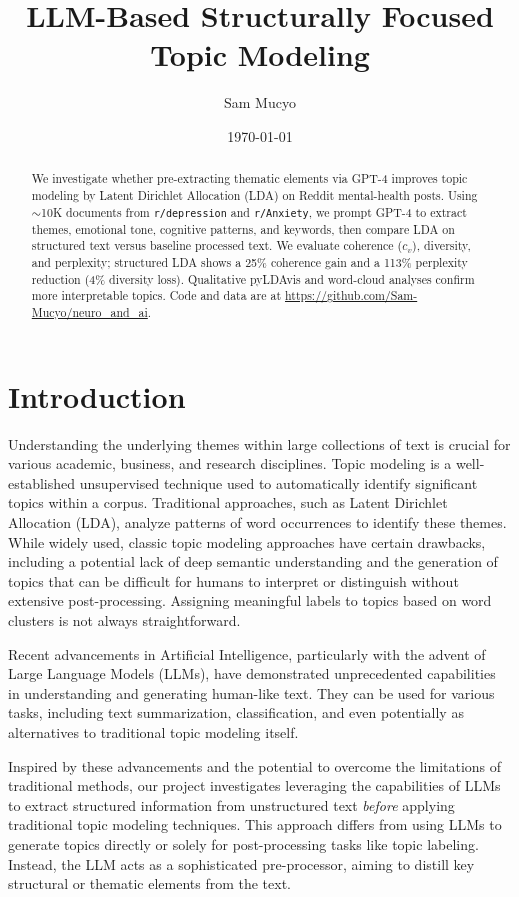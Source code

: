 \documentclass{article}
\title{LLM-Based Structurally Focused Topic Modeling}
\author{Sam Mucyo}
\date{\today}
\begin{document}
\maketitle
\doublespacing

\begin{abstract}
    We investigate whether pre-extracting thematic elements via GPT-4 improves topic modeling by Latent Dirichlet Allocation (LDA) on Reddit mental-health posts. Using $\sim$10K documents from \texttt{r/depression} and \texttt{r/Anxiety}, we prompt GPT-4 to extract themes, emotional tone, cognitive patterns, and keywords, then compare LDA on structured text versus baseline processed text. We evaluate coherence ($c_v$), diversity, and perplexity; structured LDA shows a 25\% coherence gain and a 113\% perplexity reduction (4\% diversity loss). Qualitative pyLDAvis and word-cloud analyses confirm more interpretable topics. Code and data are at \url{https://github.com/Sam-Mucyo/neuro_and_ai}.
\end{abstract}

\section{Introduction}

Understanding the underlying themes within large collections of text is crucial for various academic, business, and research disciplines. Topic modeling is a well-established unsupervised technique used to automatically identify significant topics within a corpus. Traditional approaches, such as Latent Dirichlet Allocation (LDA), analyze patterns of word occurrences to identify these themes. While widely used, classic topic modeling approaches have certain drawbacks, including a potential lack of deep semantic understanding and the generation of topics that can be difficult for humans to interpret or distinguish without extensive post-processing. Assigning meaningful labels to topics based on word clusters is not always straightforward.

Recent advancements in Artificial Intelligence, particularly with the advent of Large Language Models (LLMs), have demonstrated unprecedented capabilities in understanding and generating human-like text. They can be used for various tasks, including text summarization, classification, and even potentially as alternatives to traditional topic modeling itself.

Inspired by these advancements and the potential to overcome the limitations of traditional methods, our project investigates leveraging the capabilities of LLMs to extract structured information from unstructured text \emph{before} applying traditional topic modeling techniques. This approach differs from using LLMs to generate topics directly or solely for post-processing tasks like topic labeling. Instead, the LLM acts as a sophisticated pre-processor, aiming to distill key structural or thematic elements from the text.
\end{document}
